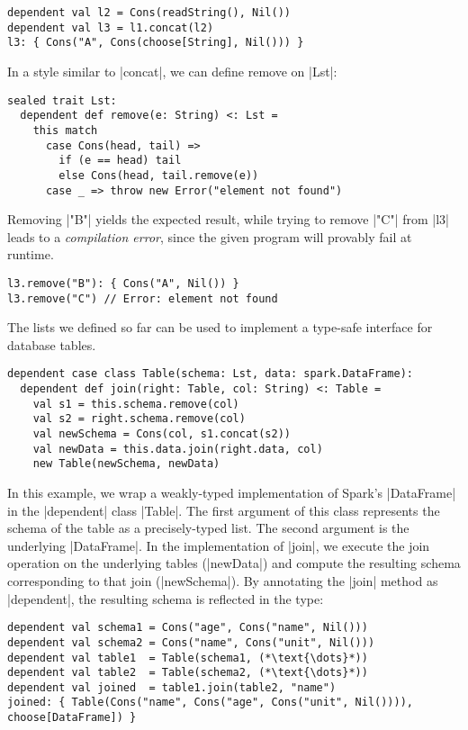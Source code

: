 \begin{lstlisting}
dependent val l2 = Cons(readString(), Nil())
dependent val l3 = l1.concat(l2)
l3: { Cons("A", Cons(choose[String], Nil())) }
\end{lstlisting}

In a style similar to |concat|, we can define remove on |Lst|:

\begin{lstlisting}
sealed trait Lst:
  dependent def remove(e: String) <: Lst =
    this match
      case Cons(head, tail) =>
        if (e == head) tail
        else Cons(head, tail.remove(e))
      case _ => throw new Error("element not found")
\end{lstlisting}

\noindent
Removing |"B"| yields the expected result, while trying to remove |"C"| from |l3| leads to a \emph{compilation error}, since the given program will provably fail at runtime.

\begin{lstlisting}
l3.remove("B"): { Cons("A", Nil()) }
l3.remove("C") // Error: element not found
\end{lstlisting}

The lists we defined so far can be used to implement a type-safe interface for database tables.

\begin{lstlisting}
dependent case class Table(schema: Lst, data: spark.DataFrame):
  dependent def join(right: Table, col: String) <: Table =
    val s1 = this.schema.remove(col)
    val s2 = right.schema.remove(col)
    val newSchema = Cons(col, s1.concat(s2))
    val newData = this.data.join(right.data, col)
    new Table(newSchema, newData)
\end{lstlisting}

\noindent
In this example, we wrap a weakly-typed implementation of Spark's |DataFrame| in the |dependent| class |Table|.
The first argument of this class represents the schema of the table as a precisely-typed list.
The second argument is the underlying |DataFrame|.
In the implementation of |join|, we execute the join operation on the underlying tables (|newData|) and compute the resulting schema corresponding to that join (|newSchema|).
By annotating the |join| method as |dependent|, the resulting schema is reflected in the type:

\begin{lstlisting}
dependent val schema1 = Cons("age", Cons("name", Nil()))
dependent val schema2 = Cons("name", Cons("unit", Nil()))
dependent val table1  = Table(schema1, (*\text{\dots}*))
dependent val table2  = Table(schema2, (*\text{\dots}*))
dependent val joined  = table1.join(table2, "name")
joined: { Table(Cons("name", Cons("age", Cons("unit", Nil()))), choose[DataFrame]) }
\end{lstlisting}

